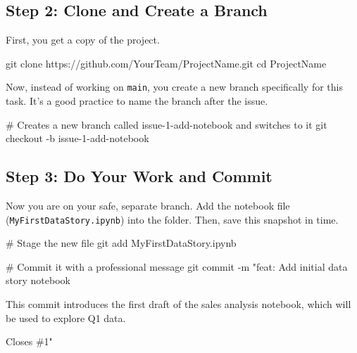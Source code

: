 \documentclass[
  letterpaper,
  DIV=11,
  numbers=noendperiod]{scrreprt}
\newenvironment{Shaded}{\begin{snugshade}}{\end{snugshade}}
\newcommand{\AttributeTok}[1]{\textcolor[rgb]{0.40,0.45,0.13}{#1}}
\newcommand{\BuiltInTok}[1]{\textcolor[rgb]{0.00,0.23,0.31}{#1}}
\newcommand{\CommentTok}[1]{\textcolor[rgb]{0.37,0.37,0.37}{#1}}
\newcommand{\FunctionTok}[1]{\textcolor[rgb]{0.28,0.35,0.67}{#1}}
\newcommand{\NormalTok}[1]{\textcolor[rgb]{0.00,0.23,0.31}{#1}}
\newcommand{\StringTok}[1]{\textcolor[rgb]{0.13,0.47,0.30}{#1}}
\begin{document}
\subsection{Step 2: Clone and Create a
Branch}\label{step-2-clone-and-create-a-branch}

First, you get a copy of the project.

\begin{Shaded}
\begin{Highlighting}[]
\FunctionTok{git}\NormalTok{ clone https://github.com/YourTeam/ProjectName.git}
\BuiltInTok{cd}\NormalTok{ ProjectName}
\end{Highlighting}
\end{Shaded}

Now, instead of working on \texttt{main}, you create a new branch
specifically for this task. It's a good practice to name the branch
after the issue.

\begin{Shaded}
\begin{Highlighting}[]
\CommentTok{\# Creates a new branch called \textquotesingle{}issue{-}1{-}add{-}notebook\textquotesingle{} and switches to it}
\FunctionTok{git}\NormalTok{ checkout }\AttributeTok{{-}b}\NormalTok{ issue{-}1{-}add{-}notebook}
\end{Highlighting}
\end{Shaded}

\subsection{Step 3: Do Your Work and
Commit}\label{step-3-do-your-work-and-commit}

Now you are on your safe, separate branch. Add the notebook file
(\texttt{MyFirstDataStory.ipynb}) into the folder. Then, save this
snapshot in time.

\begin{Shaded}
\begin{Highlighting}[]
\CommentTok{\# Stage the new file}
\FunctionTok{git}\NormalTok{ add MyFirstDataStory.ipynb}

\CommentTok{\# Commit it with a professional message}
\FunctionTok{git}\NormalTok{ commit }\AttributeTok{{-}m} \StringTok{"feat: Add initial data story notebook}

\StringTok{This commit introduces the first draft of the sales analysis notebook,}
\StringTok{which will be used to explore Q1 data.}

\StringTok{Closes \#1"}
\end{Highlighting}
\end{Shaded}
\end{document}
